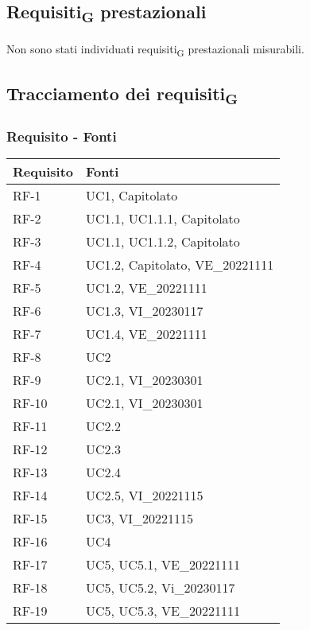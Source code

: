 \subsection{Requisiti\textsubscript{G} prestazionali}
Non sono stati individuati requisiti\textsubscript{G} prestazionali misurabili.

\subsection{Tracciamento dei requisiti\textsubscript{G}}

\subsubsection{Requisito - Fonti}
\begin{table}[H]
	\centering
	\begin{tabular}{| p{} | p{} |} 
		\hline
		\textbf{Requisito} & \textbf{Fonti} \\
		\hline
		RF-1 & UC1, Capitolato\\
		\hline
		RF-2 & UC1.1, UC1.1.1, Capitolato\\
		\hline
		RF-3 & UC1.1, UC1.1.2, Capitolato\\
		\hline
		RF-4 & UC1.2, Capitolato, VE\_20221111\\
		\hline
		RF-5 & UC1.2, VE\_20221111\\
		\hline
		RF-6 & UC1.3, VI\_20230117\\
		\hline
		RF-7 & UC1.4, VE\_20221111\\
		\hline
		RF-8 & UC2\\
        \hline
		RF-9 & UC2.1, VI\_20230301\\
        \hline
		RF-10 & UC2.1, VI\_20230301\\
        \hline
		RF-11 & UC2.2\\
        \hline
		RF-12 & UC2.3\\
        \hline
		RF-13 & UC2.4\\
		\hline
		RF-14 & UC2.5, VI\_20221115\\
         \hline
		RF-15 & UC3, VI\_20221115\\
        \hline
		RF-16 & UC4\\
         \hline
		RF-17 & UC5, UC5.1, VE\_20221111\\
        \hline
		RF-18 & UC5, UC5.2, Vi\_20230117\\
        \hline
		RF-19 & UC5, UC5.3, VE\_20221111\\
        \hline

\end{tabular}
\end{table}
